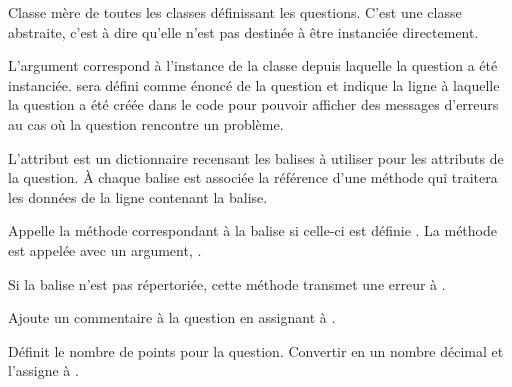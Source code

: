 \documentclass[a4,10pt,french]{sphinxmanual}
\begin{document}
\begin{fulllineitems}
\label{front-end:QuestionAbstract}
Classe mère de toutes les classes définissant les questions. C'est une classe
abstraite, c'est à dire qu'elle n'est pas destinée à être instanciée directement.

L'argument  correspond à l'instance de la classe {\hyperref[front-end:Parse]{\emph{}}}
depuis laquelle la question a été instanciée.  sera défini comme énoncé
de la question et  indique la ligne à laquelle la question a été créée
dans le code pour pouvoir afficher des messages d'erreurs au cas où la question
rencontre un problème.

L'attribut  est un dictionnaire recensant les balises à utiliser
pour les attributs de la question. À chaque balise est associée la référence d'une méthode
qui traitera les données de la ligne contenant la balise.

\begin{fulllineitems}
\label{front-end:QuestionAbstract.add_attribute}
Appelle la méthode correspondant à la balise  si celle-ci est définie
. La méthode est appelée avec un argument, .

Si la balise n'est pas répertoriée, cette méthode transmet une erreur à
.

\end{fulllineitems}


\begin{fulllineitems}
\label{front-end:QuestionAbstract.add_comment}
Ajoute un commentaire à la question en assignant  à .

\end{fulllineitems}


\begin{fulllineitems}
\label{front-end:QuestionAbstract.add_points}
Définit le nombre de points pour la question. Convertir  en
un nombre décimal et l'assigne à .


\end{fulllineitems}
\end{fulllineitems}
\end{document}
